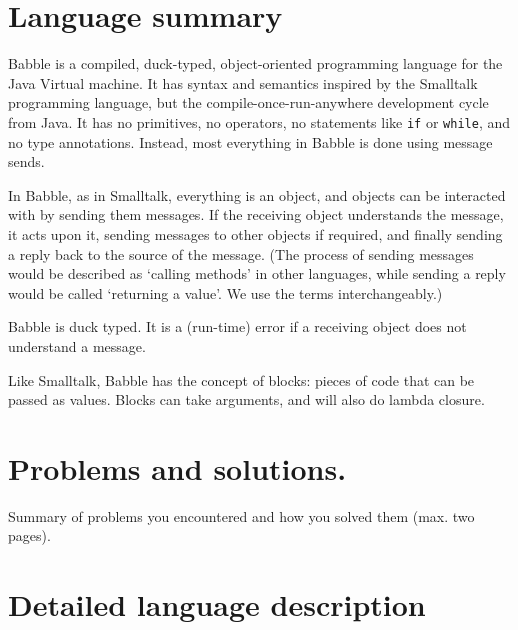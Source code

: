 \documentclass[a4paper]{article}
\begin{document}
\begin{titlepage}
\maketitle
\end{titlepage}

\tableofcontents

\section{Language summary}

Babble is a compiled, duck-typed, object-oriented programming language for the Java Virtual machine.
It has syntax and semantics inspired by the Smalltalk programming language, but the compile-once-run-anywhere development cycle from Java.
It has no primitives, no operators, no statements like \texttt{if} or \texttt{while}, and no type annotations.
Instead, most everything in Babble is done using message sends.

In Babble, as in Smalltalk, everything is an object, and objects can be interacted with by sending them messages.
If the receiving object understands the message, it acts upon it, sending messages to other objects if required, and finally sending a reply back to the source of the message.
(The process of sending messages would be described as `calling methods' in other languages, while sending a reply would be called `returning a value'.
We use the terms interchangeably.)

Babble is duck typed.
It is a (run-time) error if a receiving object does not understand a message.

Like Smalltalk, Babble has the concept of blocks: pieces of code that can be passed as values.
Blocks can take arguments, and will also do lambda closure.

\section{Problems and solutions.}
Summary of problems you encountered and how you solved them (max. two
pages).

\section{Detailed language description}
\end{document}
